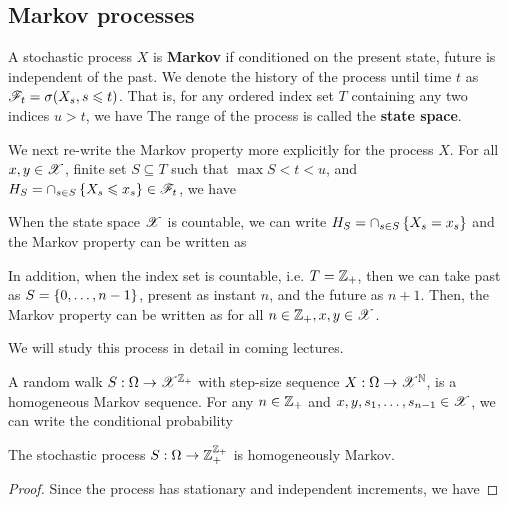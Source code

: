 \documentclass[letterpaper,10pt,english]{article}
\begin{document}
\subsection{Markov processes}
\begin{defn}
A stochastic process $X$ is \textbf{Markov} if conditioned on the present state, future is independent of the past. 
We denote the history of the process until time $t$ as $\mathscr{F}_t = \sigma(X_s, s \leqslant t)$. 
That is, for any ordered index set $T$ containing any two indices $u > t$, we have  %
The range of the process is called the \textbf{state space}. 
\end{defn}
\begin{rem}
We next re-write the Markov property more explicitly for the process $X$. 
For all $x, y \in \mathscr{X}$, finite set $S \subseteq T$ such that $\max S < t < u$, and $H_S  = \cap_{s \in S}\left\{X_s \leqslant x_s\right\} \in \mathscr{F}_t$, we have 
\end{rem}
\begin{rem}
When the state space $\mathscr{X}$ is countable, we can write $H_S = \cap_{s \in S}\left\{X_s = x_s\right\}$ and the Markov property can be written as 
\end{rem}
\begin{rem}
In addition, when the index set is countable, i.e. $T = \mathbb{Z}_+$, then we can take past as $S = \left\{0, \dots, n-1\right\}$, 
present as instant $n$, and the future as $n+1$. 
Then, the Markov property can be written as 
for all $n \in \mathbb{Z}_+, x,y \in \mathscr{X}$. 
\end{rem}
We will study this process in detail in coming lectures. 
\begin{shaded}
\begin{exmp}
A random walk $S:\Omega\to\mathscr{X}^{\mathbb{Z}_+}$ with \iid step-size sequence $X:\Omega\to\mathscr{X}^{\mathbb{N}}$, is a homogeneous Markov sequence. 
For any $n \in \mathbb{Z}_+$ and $x,y, s_1, \dots, s_{n-1} \in \mathscr{X}$, we can write the conditional probability 
\end{exmp}
\begin{lem} 
The stochastic process $S:\Omega\to\mathbb{Z}_+^{\mathbb{Z}_+}$ is homogeneously Markov. 
\end{lem}
\begin{proof} 
Since the process has stationary and independent increments, we have 
\end{proof}
\end{shaded}
\end{document}
